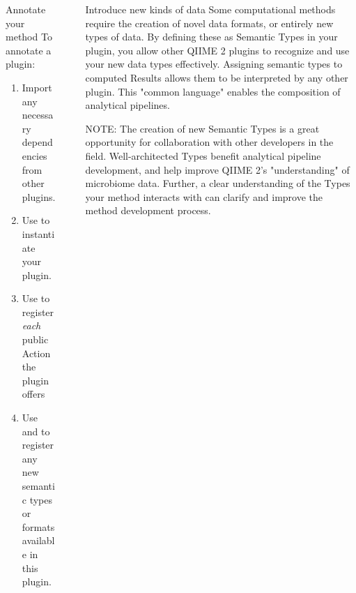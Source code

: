 \documentclass[final]{beamer}
\newlength{\sepwidth}
\newlength{\colwidth}
\newcommand{\separatorcolumn}{\begin{column}{\sepwidth}\end{column}}
\begin{document}
\begin{frame}[t]
\begin{columns}[t]
\begin{column}{\colwidth}
\begin{block}{Annotate your method}
    To annotate a plugin:

    \begin{enumerate}
      \item Import any necessary dependencies from other plugins.
      \item Use  to instantiate your plugin.
      \item Use  to register \textit{each} public Action the plugin offers
      \item Use  and  to register any new semantic types or formats available in this plugin.
    \end{enumerate}
  \end{block}

\end{column}

\separatorcolumn

\begin{column}{\colwidth}

\begin{block}{Introduce new kinds of data}
  Some computational methods require the creation of novel data formats, or
  entirely new types of data. By defining these as Semantic Types in your plugin,
  you allow other QIIME 2 plugins to recognize and use your new data types effectively.
  Assigning semantic types to computed Results allows them to be interpreted by
  any other plugin. This "common language" enables the composition of analytical pipelines.

    \begin{tcolorbox}
    [width=\textwidth, colframe=blue]
    {NOTE: The creation of new Semantic Types is a great opportunity for collaboration
    with other developers in the field. Well-architected Types benefit analytical pipeline
    development, and help improve QIIME 2's "understanding" of microbiome data. Further,
    a clear understanding of the Types your method interacts with can clarify and improve the method
    development process.}
    \end{tcolorbox}
  \end{block}


\end{column}
\end{columns}
\end{frame}
\end{document}
